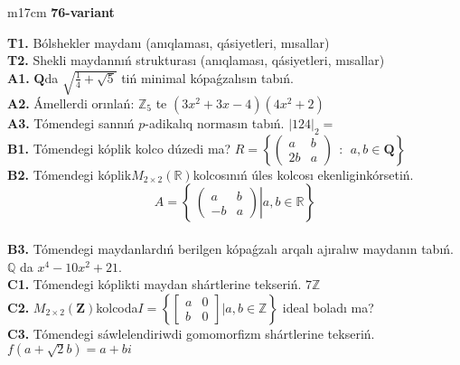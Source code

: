 \documentclass{article}
\begin{document}
\begin{tabular}{m{17cm}}
\textbf{76-variant}
\newline

\textbf{T1.} Bólshekler maydanı (anıqlaması, qásiyetleri, mısallar) \\
\textbf{T2.} Shekli maydannıń strukturası (anıqlaması, qásiyetleri, mısallar) \\
\textbf{A1.} \(\mathbf{Q}\)da \(\sqrt{\frac{1}{4} + \sqrt{5}}\) tiń minimal kópaǵzalısın tabıń. \\
\textbf{A2.} Ámellerdi orınlań: \(\mathbb{Z}_{5}\) te \(\left( 3x^{2} + 3x - 4 \right)\left( 4x^{2} + 2 \right)\) \\
\textbf{A3.} Tómendegi sannıń \(p\)-adikalıq normasın tabıń. \(|124|_{2} =\) \\
\textbf{B1.} Tómendegi kóplik kolco dúzedi ma? \(R = \left\{ \begin{pmatrix}
a & b \\
2b & a
\end{pmatrix}\ \ :\ \ a,b \in \mathbf{Q} \right\}\) \\
\textbf{B2.} Tómendegi kóplik\(M_{2 \times 2}\left( \mathbb{R} \right)\)kolcosınıń úles kolcosı ekenliginkórsetiń.
\[A = \left\{ \left. \ \begin{pmatrix}
a & b \\
 - b & a
\end{pmatrix} \right|a,b\mathbb{\in R} \right\}\] \\
\textbf{B3.} Tómendegi maydanlardıń berilgen kópaǵzalı arqalı ajıralıw maydanın tabıń. \(\mathbb{Q}\) da \(x^{4} - 10x^{2} + 21\). \\
\textbf{C1.} Tómendegi kóplikti maydan shártlerine tekseriń. \(7\mathbb{Z}\) \\
\textbf{C2.} \(M_{2 \times 2}\left( \mathbf{Z} \right)\)kolcoda\(I = \left\{ \begin{bmatrix}
a & 0 \\
b & 0
\end{bmatrix}|a,b\mathbb{\in Z} \right\}\) ideal boladı ma? \\
\textbf{C3.} Tómendegi sáwlelendiriwdi gomomorfizm shártlerine tekseriń. \(f\left( a + \sqrt{2}b \right) = a + bi\) \\

\end{tabular}
\vspace{1cm}
\end{document}
